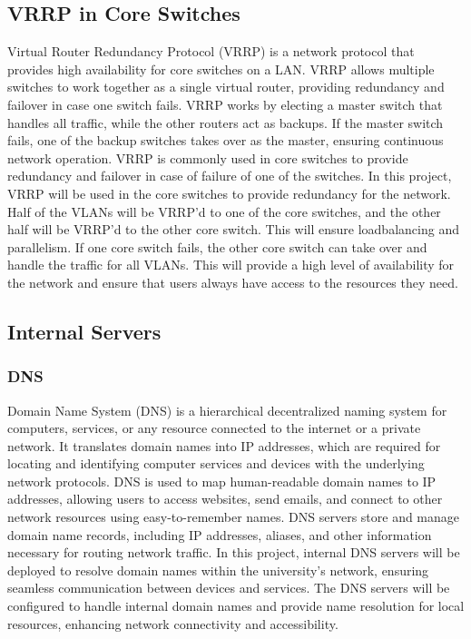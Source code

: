 \documentclass[12pt]{report}
\begin{document}
\subsection{VRRP in Core Switches}
Virtual Router Redundancy Protocol (VRRP) is a network protocol that provides high availability for core switches on a LAN. VRRP allows multiple switches to work together as a single virtual router, providing redundancy and failover in case one switch fails. VRRP works by electing a master switch that handles all traffic, while the other routers act as backups. If the master switch fails, one of the backup switches takes over as the master, ensuring continuous network operation. VRRP is commonly used in core switches to provide redundancy and failover in case of failure of one of the switches. In this project, VRRP will be used in the core switches to provide redundancy for the network. Half of the VLANs will be VRRP'd to one of the core switches, and the other half will be VRRP'd to the other core switch. This will ensure loadbalancing and parallelism. If one core switch fails, the other core switch can take over and handle the traffic for all VLANs. This will provide a high level of availability for the network and ensure that users always have access to the resources they need. %
\subsection{Internal Servers}
\subsubsection{DNS}
Domain Name System (DNS) is a hierarchical decentralized naming system for computers, services, or any resource connected to the internet or a private network. It translates domain names into IP addresses, which are required for locating and identifying computer services and devices with the underlying network protocols. DNS is used to map human-readable domain names to IP addresses, allowing users to access websites, send emails, and connect to other network resources using easy-to-remember names. DNS servers store and manage domain name records, including IP addresses, aliases, and other information necessary for routing network traffic. In this project, internal DNS servers will be deployed to resolve domain names within the university's network, ensuring seamless communication between devices and services. The DNS servers will be configured to handle internal domain names and provide name resolution for local resources, enhancing network connectivity and accessibility. %
\end{document}
